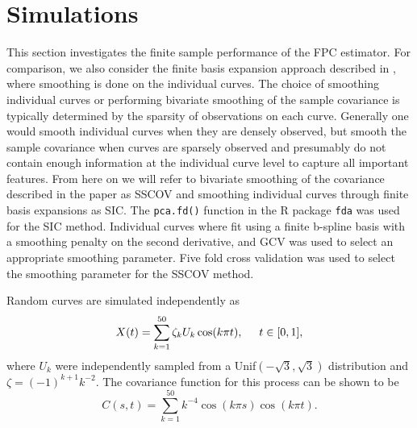 \section{Simulations} 

\label{sec:simulations}

This section investigates the finite sample performance of the FPC estimator. For comparison, we also consider the finite basis expansion approach described in \cite{FDA}, where smoothing is done on the individual curves. The choice of smoothing individual curves or performing bivariate smoothing of the sample covariance is typically determined by the sparsity of observations on each curve. Generally one would smooth individual curves when they are densely observed, but smooth the sample covariance when curves are sparsely observed and presumably do not contain enough information at the individual curve level to capture all important features. From here on we will refer to bivariate smoothing of the covariance described in the paper as SSCOV and smoothing individual curves through finite basis expansions as SIC. The \texttt{pca.fd()} function in the R package \texttt{fda} was used for the SIC method. Individual curves where fit using a finite b-spline basis with a smoothing penalty on the second derivative, and GCV was used to select an appropriate smoothing parameter. Five fold cross validation was used to select the smoothing parameter for the SSCOV method. 

Random curves are simulated independently as 
\begin{equation}
	X(t) = \sum^{50}_{k=1}\zeta_k U_k \cos(k\pi t), \hspace{0.5cm} t \in [0,1], \label{eq:sim process} 
\end{equation}
where $U_k$ were independently sampled from a Unif$(-\sqrt{3},\sqrt{3})$ distribution and \(\zeta=(-1)^{k+1}k^{-2}\). The covariance function for this process can be shown to be 
\begin{equation*}
	C(s,t) = \sum^{50}_{k=1}k^{-4} \cos(k\pi s)\cos(k\pi t). 
\end{equation*}

